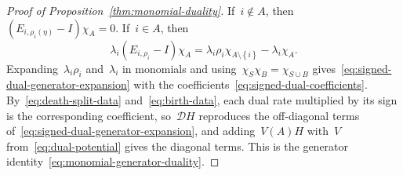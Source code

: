 \documentclass[EJP,preprint,NODS,nobera]{ejpecp}
\newcommand{\bb}[1]{\left(#1\right)}
\newcommand{\cb}[1]{\left\{#1\right\}}
\newcommand{\Dcal}{\mathcal{D}}
\begin{document}
\begin{proof}[Proof of Proposition~\ref{thm:monomial-duality}]
If~$i\notin A$, then~$\bb{E_{i,\rho_i(\eta)}-I}\chi_A=0$. If~$i\in A$, then
\begin{equation*}
\lambda_i\bb{E_{i,\rho_i}-I}\chi_A
=
\lambda_i\rho_i\chi_{A\setminus\cb{i}}
-
\lambda_i\chi_A.
\end{equation*}
Expanding~$\lambda_i\rho_i$ and~$\lambda_i$ in monomials and
using~$\chi_S\chi_B=\chi_{S\cup B}$ gives~\eqref{eq:signed-dual-generator-expansion}
with the coefficients~\eqref{eq:signed-dual-coefficients}.
By~\eqref{eq:death-split-data} and~\eqref{eq:birth-data}, each dual rate
multiplied by its sign is the corresponding coefficient, so~$\Dcal H$
reproduces the off-diagonal terms of~\eqref{eq:signed-dual-generator-expansion},
and adding~$V(A)H$ with~$V$ from~\eqref{eq:dual-potential} gives the diagonal
terms. This is the generator identity~\eqref{eq:monomial-generator-duality}.


\end{proof}
\end{document}
